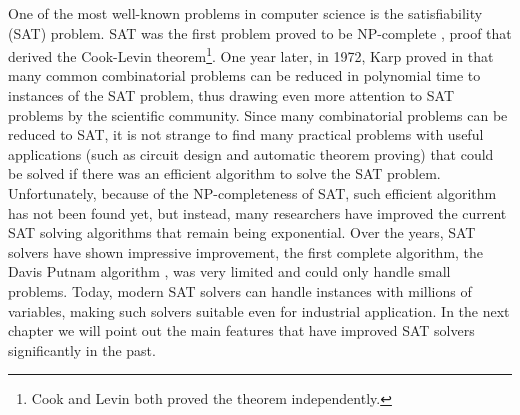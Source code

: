 \documentclass[12pt]{diicc}
\begin{document}
One of the most well-known problems in computer science is the satisfiability (SAT) problem. SAT was the first problem proved to be NP-complete \cite{cook1971}, proof that derived the Cook-Levin theorem\footnote[1]{Cook and Levin both proved the theorem independently.}. One year later, in 1972, Karp proved in \cite{karp1972} that many common combinatorial problems can be reduced in polynomial time to instances of the SAT problem, thus drawing even more attention to SAT problems by the scientific community. Since many combinatorial problems can be reduced to SAT, it is not strange to find many practical problems with useful applications (such as circuit design and automatic theorem proving) that could be solved if there was an efficient algorithm to solve the SAT problem. Unfortunately, because of the NP-completeness of SAT, such efficient algorithm has not been found yet, but instead, many researchers have improved the current SAT solving algorithms that remain being exponential. Over the years, SAT solvers have shown impressive improvement, the first complete algorithm, the Davis Putnam algorithm \cite{DP1960}, was very limited and could only handle small problems. Today, modern SAT solvers can handle instances with millions of variables, making such solvers suitable even for industrial application. In the next chapter we will point out the main features that have improved SAT solvers significantly in the past.
\end{document}
